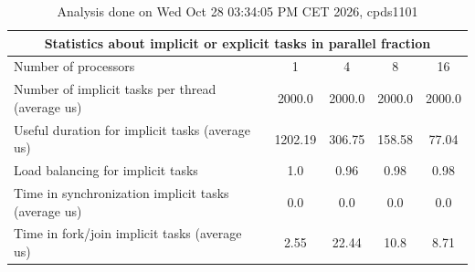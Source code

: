 \begin{table}[h]
\begin{center}
\begin{tabular}{|l|c|c|c|c|}
\hline
\multicolumn{5}{|c|}{Statistics about implicit or explicit tasks in parallel fraction} \\
\hline
\hline
Number of processors & 1 & 4 & 8 & 16 \\
\hline
\hline
Number of implicit tasks per thread (average us)    &          2000.0 &          2000.0 &          2000.0 &          2000.0 \\
\hline
Useful duration for implicit tasks (average us)     &         1202.19 &          306.75 &          158.58 &           77.04 \\
\hline
Load balancing for implicit tasks                &             1.0 &            0.96 &            0.98 &            0.98 \\
\hline
Time in synchronization implicit tasks (average us) &             0.0 &             0.0 &             0.0 &             0.0 \\
\hline
Time in fork/join implicit tasks (average us)       &            2.55 &           22.44 &            10.8 &            8.71 \\
\hline
\end{tabular}
\end{center}
\caption{ Analysis done on Wed Oct 28 03:34:05 PM CET 2026, cpds1101}
\end{table}
